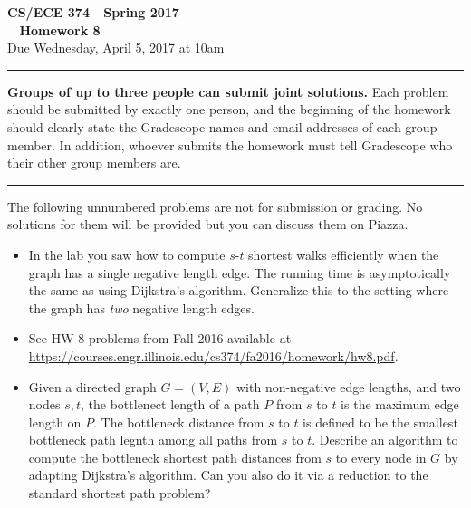 \documentclass[11pt]{article}
\begin{document}

\thispagestyle{empty}

\begin{center}
\Large\textbf{CS/ECE 374 \,\decosix\,  Spring 2017}%
\\
\LARGE\textbf{\decothreeleft~ Homework 8 ~\decothreeright}%
\\[0.5ex]
\large Due Wednesday, April 5, 2017 at 10am
\end{center}

\bigskip
\hrule
\bigskip

\noindent
\textbf{Groups of up to three people can submit joint solutions.}  Each problem should be submitted by exactly one person, and the beginning of the homework should clearly state the Gradescope names and email addresses of each group member.  In addition, whoever submits the homework must tell Gradescope who their other group members are.
\bigskip
\hrule
\bigskip


\noindent
The following unnumbered problems are not for submission or grading. 
No solutions for them will be provided but you can discuss them on Piazza.
\begin{itemize}
\item In the lab you saw how to compute $s$-$t$ shortest walks
efficiently when the graph has a single negative length edge. The running
time is asymptotically the same as using Dijkstra's algorithm. Generalize
this to the setting where the graph has {\em two} negative length edges.

\item See HW 8 problems from Fall 2016 available at 
\url{https://courses.engr.illinois.edu/cs374/fa2016/homework/hw8.pdf}.
\item Given a directed graph $G=(V,E)$ with non-negative edge lengths,
and two nodes $s,t$, the bottlenect length of a path $P$ from
$s$ to $t$ is the maximum edge length on $P$. The bottleneck distance
from $s$ to $t$ is defined to be the smallest bottleneck path legnth
among all paths from $s$ to $t$. Describe an algorithm to compute
the bottleneck shortest path distances from $s$ to every node in $G$
by adapting Dijkstra's algorithm. Can you also do it via a reduction
to the standard shortest path problem?
\end{itemize}

\vspace{1cm}
\end{document}
